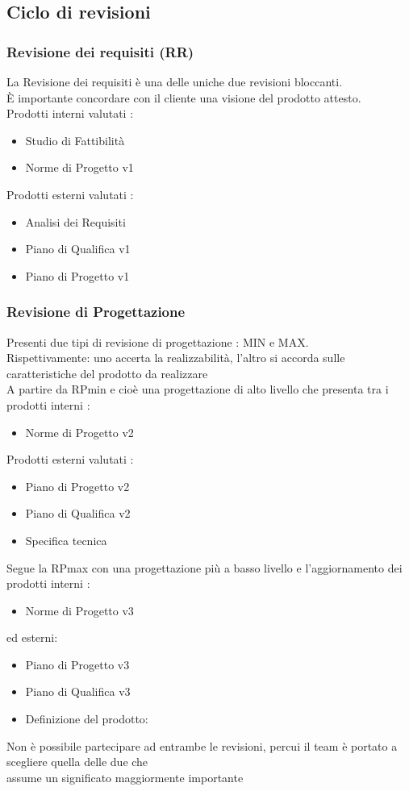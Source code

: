 \documentclass[12pt,a4paper,titlepage]{article}
\begin{document}
	\normalsize
	\subsection{Ciclo di revisioni}
	\subsubsection{Revisione dei requisiti (RR)}
	La Revisione dei requisiti è una delle uniche due revisioni bloccanti.\\
	È importante concordare con il cliente una visione del prodotto attesto.\\
	Prodotti interni valutati :
	\begin{itemize}
		\item Studio di Fattibilità
		\item Norme di Progetto v1
	\end{itemize}
	Prodotti esterni valutati :
	\begin{itemize}
		\item Analisi dei Requisiti
		\item Piano di Qualifica v1
		\item Piano di Progetto v1
	\end{itemize}
	
	\subsubsection{Revisione di Progettazione}
	Presenti due tipi di revisione di progettazione : MIN e MAX. \\
	Rispettivamente: uno accerta la realizzabilità, l'altro si accorda sulle caratteristiche del prodotto da realizzare\\
	A partire da RPmin e cioè una progettazione di alto livello che presenta tra i prodotti interni :
	\begin{itemize}
		\item Norme di Progetto v2
	\end{itemize}
	Prodotti esterni valutati : 
	\begin{itemize}
		\item Piano di Progetto v2
		\item Piano di Qualifica v2
		\item Specifica tecnica
	\end{itemize}
	Segue la RPmax con una progettazione più a basso livello e l'aggiornamento dei prodotti interni :
	\begin{itemize}
		\item Norme di Progetto v3
	\end{itemize}
	ed esterni:
	\begin{itemize}
		\item Piano di Progetto v3
		\item Piano di Qualifica v3
		\item Definizione del prodotto:
	\end{itemize}
	Non è possibile partecipare ad entrambe le revisioni, percui il team è portato a scegliere quella delle due che\\
	assume un significato maggiormente importante
	
\end{document}
